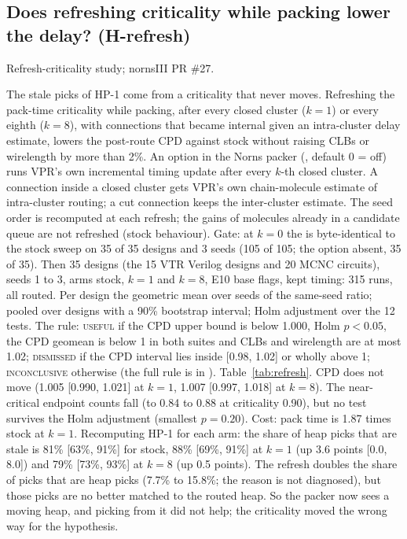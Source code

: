 \subsection{Does refreshing criticality while packing lower the delay? (H-refresh)}
\label{sec:e-refresh}

 Refresh-criticality study; nornsIII PR \#27.

 The stale picks of HP-1 come from a criticality that never moves. Refreshing the pack-time criticality while packing, after every closed cluster ($k=1$) or every eighth ($k=8$), with connections that became internal given an intra-cluster delay estimate, lowers the post-route CPD against stock without raising CLBs or wirelength by more than 2\%.
 An option in the Norns packer (, default 0 = off) runs VPR's own incremental timing update after every $k$-th closed cluster. A connection inside a closed cluster gets VPR's own chain-molecule estimate of intra-cluster routing; a cut connection keeps the inter-cluster estimate. The seed order is recomputed at each refresh; the gains of molecules already in a candidate queue are not refreshed (stock behaviour). Gate: at $k=0$ the  is byte-identical to the stock sweep on 35 of 35 designs and 3 seeds (105 of 105; the option absent, 35 of 35). Then 35 designs (the 15 VTR Verilog designs and 20 MCNC circuits), seeds 1 to 3, arms stock, $k=1$ and $k=8$, E10 base flags, kept timing: 315 runs, all routed. Per design the geometric mean over seeds of the same-seed ratio; pooled over designs with a 90\% bootstrap interval; Holm adjustment over the 12 tests. The rule: \textsc{useful} if the CPD upper bound is below 1.000, Holm $p<0.05$, the CPD geomean is below 1 in both suites and CLBs and wirelength are at most 1.02; \textsc{dismissed} if the CPD interval lies inside [0.98, 1.02] or wholly above 1; \textsc{inconclusive} otherwise (the full rule is in ).
 Table~\ref{tab:refresh}. CPD does not move (1.005 [0.990, 1.021] at $k=1$, 1.007 [0.997, 1.018] at $k=8$). The near-critical endpoint counts fall (to 0.84 to 0.88 at criticality 0.90), but no test survives the Holm adjustment (smallest $p=0.20$). Cost: pack time is 1.87 times stock at $k=1$.
 Recomputing HP-1 for each arm: the share of heap picks that are stale is 81\% [63\%, 91\%] for stock, 88\% [69\%, 91\%] at $k=1$ (up 3.6 points [0.0, 8.0]) and 79\% [73\%, 93\%] at $k=8$ (up 0.5 points). The refresh doubles the share of picks that are heap picks (7.7\% to 15.8\%; the reason is not diagnosed), but those picks are no better matched to the routed heap. So the packer now sees a moving heap, and picking from it did not help; the criticality moved the wrong way for the hypothesis.

